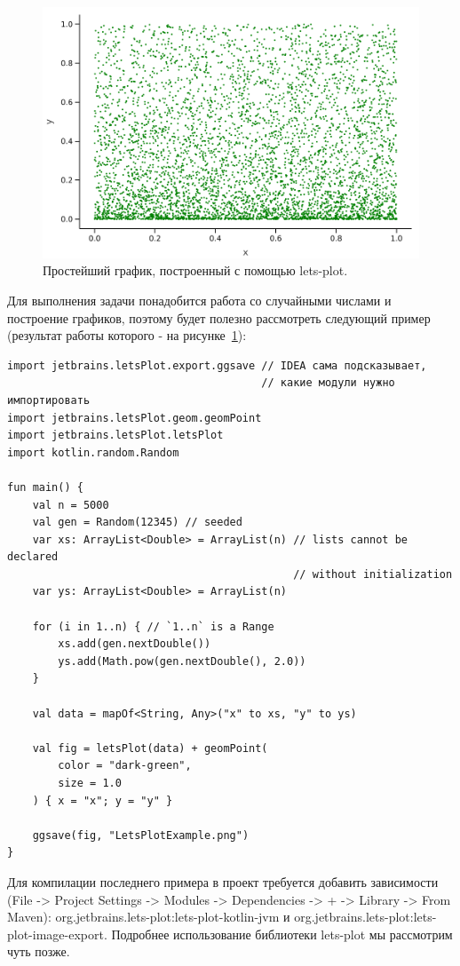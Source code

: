\documentclass{book}
\begin{document}
\begin{figure}
	\includegraphics[width=1\linewidth]{LetsPlotExample.png}
    \caption{\label{LetsPlotExample}Простейший график, построенный с помощью lets-plot.}
\end{figure}

Для выполнения задачи понадобится работа со случайными числами и построение графиков, поэтому будет
полезно рассмотреть следующий пример (результат работы которого - на
рисунке~\ref{LetsPlotExample}):
\begin{verbatim}
import jetbrains.letsPlot.export.ggsave // IDEA сама подсказывает,
                                        // какие модули нужно импортировать
import jetbrains.letsPlot.geom.geomPoint
import jetbrains.letsPlot.letsPlot
import kotlin.random.Random

fun main() {
    val n = 5000
    val gen = Random(12345) // seeded
    var xs: ArrayList<Double> = ArrayList(n) // lists cannot be declared
                                             // without initialization
    var ys: ArrayList<Double> = ArrayList(n)

    for (i in 1..n) { // `1..n` is a Range
        xs.add(gen.nextDouble())
        ys.add(Math.pow(gen.nextDouble(), 2.0))
    }

    val data = mapOf<String, Any>("x" to xs, "y" to ys)

    val fig = letsPlot(data) + geomPoint(
        color = "dark-green",
        size = 1.0
    ) { x = "x"; y = "y" }

    ggsave(fig, "LetsPlotExample.png")
}
\end{verbatim}

Для компилации последнего примера в проект требуется добавить зависимости (File -> Project Settings
-> Modules -> Dependencies -> + -> Library -> From Maven):
org.jetbrains.lets-plot:lets-plot-kotlin-jvm и org.jetbrains.lets-plot:lets-plot-image-export. 
Подробнее использование библиотеки lets-plot мы рассмотрим чуть позже.
\end{document}

